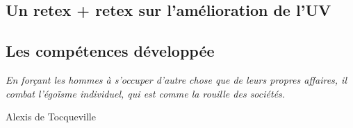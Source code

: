 
\subsection{Un retex + retex sur l’amélioration de l’UV}

\subsection{Les compétences développée}



\begin{center}
    \textit{\og En forçant les hommes à s'occuper d'autre chose que de leurs propres affaires, il combat l'égoïsme individuel, qui est comme la rouille des sociétés. \fg{}}

    Alexis de Tocqueville\cite{De_la_Democratie_en_Amerique}
\end{center}
